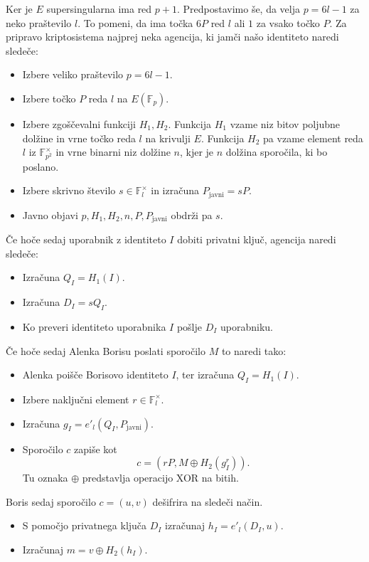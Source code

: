 \documentclass[12pt,a4paper,twoside]{article}
\theoremstyle{definition} %
\theoremstyle{plain} %
\numberwithin{equation}{section}  %
\newcommand{\F}{\mathbb F}
\newcommand{\E}[1]{E({#1})}
\begin{document}
Ker je $E$ supersingularna ima red $p+1$. Predpostavimo še, da velja $p = 6l-1$ za neko praštevilo $l$. To pomeni, da ima točka $6P$ red $l$ ali $1$ za vsako točko $P$.
Za pripravo kriptosistema najprej neka agencija, ki jamči našo identiteto naredi sledeče:
\begin{itemize}
\item Izbere veliko praštevilo $p = 6l-1$.
\item Izbere točko $P$ reda $l$ na $\E{\F_p}$.
\item Izbere zgoščevalni funkciji $H_1, H_2$. Funkcija $H_1$ vzame niz bitov poljubne dolžine in vrne točko reda $l$ na krivulji $E$. Funkcija $H_2$ pa vzame element reda $l$ iz $\F^{\times}_{p^2}$ in vrne binarni niz dolžine $n$, kjer je $n$ dolžina sporočila, ki bo poslano.
\item Izbere skrivno število $s\in \F^{\times}_l$ in izračuna $P_{\text{javni}} = sP$.
\item Javno objavi $p,H_1,H_2,n,P,P_{\text{javni}}$ obdrži pa $s$.
\end{itemize}

Če hoče sedaj uporabnik z identiteto $I$ dobiti privatni ključ, agencija naredi sledeče:

\begin{itemize}
\item Izračuna $Q_I = H_1(I)$.
\item Izračuna $D_I = sQ_I$.
\item Ko preveri identiteto uporabnika $I$ pošlje $D_I$ uporabniku.
\end{itemize}

Če hoče sedaj Alenka Borisu poslati sporočilo $M$ to naredi tako:

\begin{itemize}
\item Alenka poišče Borisovo identiteto $I$, ter izračuna $Q_I = H_1(I)$.
\item Izbere naključni element $r \in \F^{\times}_l$.
\item Izračuna $g_I = e'_l(Q_I,P_{\text{javni}})$.
\item Sporočilo $c$ zapiše kot
$$c = (rP,M \oplus H_2(g^r_I)).$$
Tu oznaka $\oplus$ predstavlja operacijo XOR na bitih.
\end{itemize}

Boris sedaj sporočilo $c = (u,v)$ dešifrira na sledeči način.
\begin{itemize}
\item S pomočjo privatnega ključa $D_I$ izračunaj $h_I = e'_l(D_I,u)$.
\item Izračunaj $m= v \oplus H_2(h_I)$.
\end{itemize}
\end{document}
